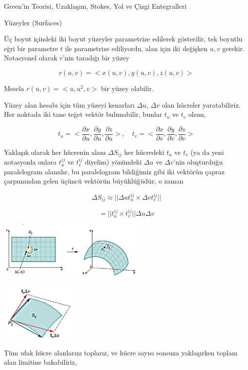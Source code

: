\documentclass[12pt,fleqn]{article}\usepackage{../../common}
\begin{document}
Green'in Teorisi, Uzaklaşım, Stokes, Yol ve Çizgi Entegralleri

Yüzeyler (Surfaces)

Üç boyut içindeki iki boyut yüzeyler parametrize edilerek gösterilir,
tek boyutlu eğri bir parametre $t$ ile parametrize ediliyordu, alan için
iki değişken $u,v$ gerekir. Notasyonel olarak $r$'nin taradığı bir yüzey

$$
r(u,v) = < x(u,v), y(u,v), z(u,v) >
$$

Mesela $r(u,v) = < u, u^2, v >$ bir yüzey olabilir.

Yüzey alan hesabı için tüm yüzeyi kenarları $\Delta u$, $\Delta v$ olan hücreler
yaratabiliriz. Her noktada iki tane teğet vektör bulunabilir, bunlar $t_u$ ve
$t_v$ olsun,

$$
t_u = < \frac{\partial x}{\partial u},
        \frac{\partial y}{\partial u},
        \frac{\partial z}{\partial u} >, \quad
t_v = < \frac{\partial x}{\partial v},
        \frac{\partial y}{\partial v},
        \frac{\partial z}{\partial v} >        
$$

Yaklaşık olarak her hücrenin alanı $\Delta S_{ij}$ her hücredeki $t_u$ ve $t_v$
(ya da yeni notasyonla onlara $t_u^{ij}$ ve $t_v^{ij}$ diyelim) yönündeki
$\Delta u$ ve $\Delta v$'nin oluşturduğu paralelogram alanıdır, bu paralelogram
bildiğimiz gibi iki vektörün çapraz çarpımından gelen üçüncü vektörün
büyüklüğüdür, o zaman 

$$
\Delta S_{ij} \approx || \Delta u t_u^{ij} \times \Delta v t_v^{ij} ||
$$

$$
= ||  t_u^{ij} \times t_v^{ij} || \Delta u \Delta v
$$
        
\includegraphics[width=20em]{calc_multi_75_app_01.jpg}

\includegraphics[width=10em]{calc_multi_75_app_02.jpg}

Tüm ufak hücre alanlarını toplarız, ve hücre sayısı sonsuza yaklaşırken toplam
alan limitine bakabiliriz,
\end{document}
